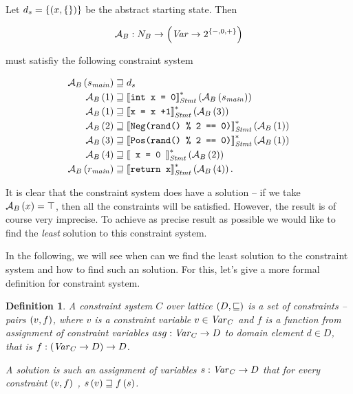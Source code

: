 \documentclass[..thesis.tex]{subfiles}
\newtheorem{defin}{Definition}[section]
\begin{document}
Let $d_s = \left\lbrace \left( x, \left\lbrace \right\rbrace \right) \right\rbrace $ be the abstract starting state.
Then 

\begin{equation*}
\mathcal{A}_B : N_B \to \left( \mathit{Var} \to 2^{ \left\lbrace -, 0, + \right\rbrace } \right)
\end{equation*}

 must satisfiy the following constraint system

\begin{equation*}
  \begin{split}
    \mathcal{A}_B \left( s_{\mathit{main}} \right) & \sqsupseteq d_s \\
    \mathcal{A}_B \left( 1 \right) & \sqsupseteq \left\llbracket \text{\texttt{int x = 0}} \right\rrbracket_{\mathit{Stmt}}^{*} \left( \mathcal{A}_B \left( s_{\mathit{main}} \right) \right) \\
    \mathcal{A}_B \left( 1 \right) & \sqsupseteq \left\llbracket \text{\texttt{x = x +1}}  \right\rrbracket_{\mathit{Stmt}}^{*} \left( \mathcal{A}_B \left( 3 \right) \right) \\
    \mathcal{A}_B \left( 2 \right) & \sqsupseteq \left\llbracket  \text{\texttt{Neg(rand() \% 2 == 0)}}  \right\rrbracket_{\mathit{Stmt}}^{*} \left( \mathcal{A}_B \left( 1 \right) \right) \\
    \mathcal{A}_B \left( 3 \right) & \sqsupseteq \left\llbracket  \text{\texttt{Pos(rand() \% 2 == 0)}}  \right\rrbracket_{\mathit{Stmt}}^{*} \left( \mathcal{A}_B \left( 1 \right) \right) \\
    \mathcal{A}_B \left( 4 \right) & \sqsupseteq \left\llbracket \text{\texttt{ x = 0 }} \right\rrbracket_{\mathit{Stmt}}^{*} \left( \mathcal{A}_B \left( 2 \right) \right) \\
    \mathcal{A}_B \left( r_{\mathit{main}} \right)  & \sqsupseteq \left\llbracket  \text{\texttt{return x}}  \right\rrbracket_{\mathit{Stmt}}^{*} \left( \mathcal{A}_B \left( 4 \right) \right) \text{.}
  \end{split} 
\end{equation*}


It is clear that the constraint system does have a solution -- if we take $\mathcal{A}_B \left( x \right) = \top$, then all the constraints will be satisfied.
However, the result is of course very imprecise. To achieve as precise result as possible we  would like to find the \textit{least} solution to this constraint system. 

In the following, we will see when can we find the least solution to the constraint system and how to find such an solution. For this, let's give a more formal definition for constraint system.

\begin{defin}
A \textit{constraint system} $C$ over lattice $\left( D, \sqsubseteq \right)$ is a set of \textit{constraints} -- pairs $\left( v, f \right)$,
where $v$ is a constraint variable $v \in \mathit{Var}_C$ and $f$ is a function from assignment of constraint variables $asg: \mathit{Var}_C \to D$ to domain element $d \in D$,
that is $f : \left( \mathit{Var}_C \to D \right) \to D$.

A \textit{solution} is such an assignment of variables $s : \mathit{Var}_C -> D$ that for every constraint $\left( v, f \right)$ , $ s \left( v \right) \sqsupseteq f \left( s \right)$. 
\end{defin}
\end{document}
